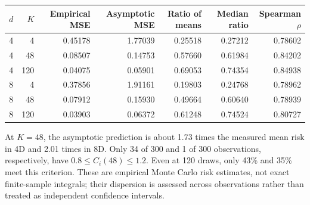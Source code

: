 \documentclass[10pt,letterpaper]{article}
\begin{document}
\begin{center}\begin{minipage}{\linewidth}\centering\small
\begin{tabular}{@{}rr rrr rr@{}}
\toprule
$d$ & $K$ & Empirical MSE & Asymptotic MSE & Ratio of means & Median ratio & Spearman $\rho$\\
\midrule
4&4&0.45178&1.77039&0.25518&0.27212&0.78602\\
4&48&0.08507&0.14753&0.57660&0.61984&0.84202\\
4&120&0.04075&0.05901&0.69053&0.74354&0.84938\\
8&4&0.37856&1.91161&0.19803&0.24768&0.78962\\
8&48&0.07912&0.15930&0.49664&0.60640&0.78939\\
8&120&0.03903&0.06372&0.61248&0.74524&0.80727\\
\bottomrule
\end{tabular}
\label{tab:risk}
\end{minipage}\end{center}
At $K=48$, the asymptotic prediction is about 1.73 times the measured mean risk in 4D and 2.01 times in 8D. Only 34 of 300 and 1 of 300 observations, respectively, have $0.8\leq C_i(48)\leq1.2$. Even at 120 draws, only 43\% and 35\% meet this criterion. These are empirical Monte Carlo risk estimates, not exact finite-sample integrals; their dispersion is assessed across observations rather than treated as independent confidence intervals.
\end{document}
